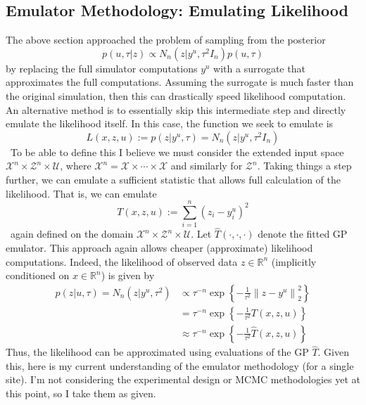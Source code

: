 \documentclass[12pt]{article}
\newcommand*{\norm}[1]{\left\lVert#1\right\rVert}
\newcommand{\R}{\mathcal{R}}
\def\R{\mathbb{R}}
\begin{document}
\subsection{Emulator Methodology: Emulating Likelihood}
The above section approached the problem of sampling from the posterior
\[p(u, \tau|z) \propto N_n(z|y^u, \tau^2 I_n)p(u, \tau)\]
by replacing the full simulator computations $y^u$ with a surrogate that approximates the full computations. Assuming the surrogate is much faster than the original simulation, then 
this can drastically speed likelihood computation. An alternative method is to essentially skip this intermediate step and directly emulate the likelihood itself. In this case, the function 
we seek to emulate is
\[L(x, z, u) := p(z|y^{u}, \tau) = N_n(z|y^{u}, \tau^2 I_n)\]\
To be able to  define this I believe we must consider the extended input space $\mathcal{X}^n \times \mathcal{Z}^n \times \mathcal{U}$, where $\mathcal{X}^n = \mathcal{X} \times \cdots \times \mathcal{X}$
and similarly for $\mathcal{Z}^n$.
Taking things a step further, we can emulate a sufficient statistic that allows full calculation of the likelihood. That is, we can emulate
\[T(x, z, u) := \sum_{i = 1}^n (z_i - y_i^{u})^2\]\
again defined on the domain $\mathcal{X}^n \times \mathcal{Z}^n \times \mathcal{U}$. Let $\hat{T}(\cdot, \cdot, \cdot)$ denote the fitted GP emulator. 
This approach again allows cheaper (approximate) likelihood computations. Indeed, the likelihood of observed data $z \in \R^n$ (implicitly conditioned on $x \in \R^n$) is given by  
\begin{align*}
p(z|u, \tau) = N_n(z|y^u, \tau^2) &\propto \tau^{-n} \exp\left\{-\frac{1}{\tau^2} \norm{z - y^u}^2_2 \right\} \\
					         &= \tau^{-n} \exp\left\{-\frac{1}{\tau^2} T(x, z, u) \right\} \\
					         &\approx \tau^{-n} \exp\left\{-\frac{1}{\tau^2} \hat{T}(x, z, u) \right\}
\end{align*}
Thus, the likelihood can be approximated using evaluations of the GP $\hat{T}$. 
Given this, here is my current understanding of the emulator methodology (for a single site). I'm not considering the experimental design or MCMC methodologies yet at this point, so 
I take them as given. 
\end{document}
